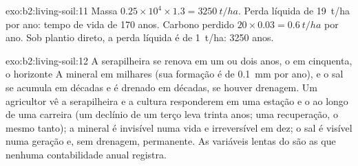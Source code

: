 \begin{solution}{exo:b2:living-soil:11}
Massa $0.25\times 10^{4}\times 1.3 = \qty{3250}{t/ha}$. Perda líquida de
\qty{19}{t/ha} por ano: tempo de vida de 170 anos. Carbono perdido $20\times
0.03 = \qty{0.6}{t/ha}$ por ano. Sob plantio direto, a perda líquida é de
\qty{1}{t/ha}: 3250 anos.
\end{solution}

\begin{solution}{exo:b2:living-soil:12}
A serapilheira se renova em um ou dois anos, o  em cinquenta, o
horizonte A mineral em milhares (sua formação é de \qty{0.1}{mm} por ano),
e o sal se acumula em décadas e é drenado em décadas, se houver
drenagem. Um agricultor vê a serapilheira e a cultura responderem em uma
estação e o  ao longo de uma carreira (um declínio de um terço leva
trinta anos; uma recuperação, o mesmo tanto); a  mineral é
invisível numa vida e irreversível em dez; o sal é visível numa geração
e, sem drenagem, permanente. As variáveis lentas do  são as que
nenhuma contabilidade anual registra.
\end{solution}

